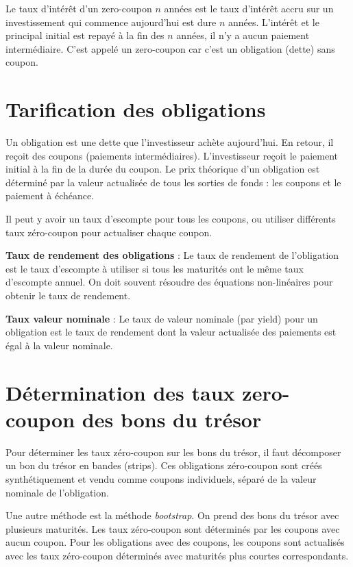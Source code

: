 Le taux d'intérêt d'un zero-coupon $n$ années est le taux d'intérêt accru sur un investissement qui commence aujourd'hui est dure $n$ années. L'intérêt et le principal initial est repayé à la fin des $n$ années, il n'y a aucun paiement intermédiaire. C'est appelé un zero-coupon car c'est un obligation (dette) sans coupon. 


\section{Tarification des obligations}

Un obligation est une dette que l'investisseur achète aujourd'hui. En retour, il reçoit des coupons (paiements intermédiaires). L'investisseur reçoit le paiement initial à la fin de la durée du coupon. Le prix théorique d'un obligation est déterminé par la valeur actualisée de tous les sorties de fonds : les coupons et le paiement à échéance. 

Il peut y avoir un taux d'escompte pour tous les coupons, ou utiliser différents taux zéro-coupon pour actualiser chaque coupon. 

\textbf{Taux de rendement des obligations} : Le taux de rendement de l'obligation est le taux d'escompte à utiliser si tous les maturités ont le même taux d'escompte annuel. On doit souvent résoudre des équations non-linéaires pour obtenir le taux de rendement.

\textbf{Taux valeur nominale} : Le taux de valeur nominale (par yield) pour un obligation est le taux de rendement dont la valeur actualisée des paiements est égal à la valeur nominale.

\section{Détermination des taux zero-coupon des bons du trésor}

Pour déterminer les taux zéro-coupon sur les bons du trésor, il faut décomposer un bon du trésor en bandes (strips). Ces obligations zéro-coupon sont créés synthétiquement et vendu comme coupons individuels, séparé de la valeur nominale de l'obligation. 


Une autre méthode est la méthode \textit{bootstrap}. On prend des bons du trésor avec plusieurs maturités. Les taux zéro-coupon sont déterminés par les coupons avec aucun coupon. Pour les obligations avec des coupons, les coupons sont actualisés avec les taux zéro-coupon déterminés avec maturités plus courtes correspondants. 

